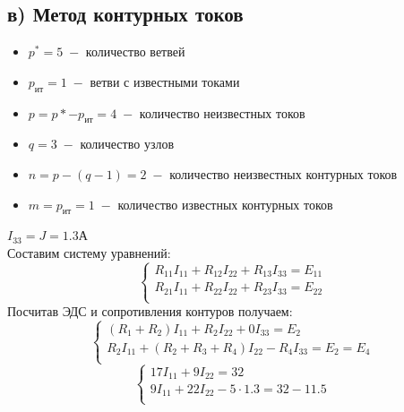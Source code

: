 \documentclass[12pt,fleqn]{article}
\begin{document}
\begin{justify}
\newpage

    \subsection{в) Метод контурных токов}

    \begin{itemize}
        \item $p^* = 5 \;- $ количество ветвей
        \item $ p_\text{ит} = 1 \; - $ ветви с известными токами
        \item $ p = p* - p_\text{ит} = 4 \; - $ количество неизвестных токов
        \item $ q = 3 \; - $ количество узлов
        \item $ n = p - (q - 1) = 2 \; - $ количество неизвестных контурных токов
        \item $ m = p_\text{ит} = 1 \; - $ количество известных контурных токов
    \end{itemize}

    $I_{33} = J = 1.3 \text{А}$ \\
    Составим систему уравнений:
    \begin{equation}
        \begin{cases}
            R_{11}I_{11} + R_{12}I_{22} + R_{13}I_{33} = E_{11} \\
            R_{21}I_{11} + R_{22}I_{22} + R_{23}I_{33} = E_{22} \\
        \end{cases}
    \end{equation}
    Посчитав ЭДС и сопротивления контуров получаем:
    \begin{equation}
        \begin{cases}
            (R_1 + R_2)I_{11} + R_2I_{22} + 0I_{33} = E_2 \\
            R_2I_{11} + (R_2 + R_3 + R_4)I_{22} - R_4I_{33} = E_2 = E_4 \\
        \end{cases}
    \end{equation}
    \begin{equation}
        \begin{cases}
            17I_{11} + 9I_{22} = 32 \\
            9I_{11} + 22I_{22} - 5 \cdot 1.3 = 32 - 11.5 \\
        \end{cases}
    \end{equation}


\end{justify}
\end{document}
